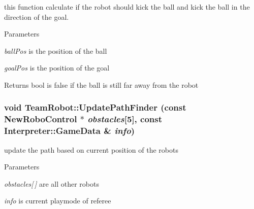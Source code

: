 this function calculate if the robot should kick the ball and kick the ball in the direction of the goal. 


\begin{DoxyParams}{Parameters}
\item[{\em ballPos}]is the position of the ball \item[{\em goalPos}]is the position of the goal \end{DoxyParams}
\begin{DoxyReturn}{Returns}
bool is false if the ball is still far away from the robot 
\end{DoxyReturn}
\hypertarget{classTeamRobot_a1216ffb71821002b6e6845390c990d5f}{
\subsubsection[{UpdatePathFinder}]{\setlength{\rightskip}{0pt plus 5cm}void TeamRobot::UpdatePathFinder (const {\bf NewRoboControl} $\ast$ {\em obstacles}\mbox{[}5\mbox{]}, \/  const {\bf Interpreter::GameData} \& {\em info})}}
\label{classTeamRobot_a1216ffb71821002b6e6845390c990d5f}


update the path based on current position of the robots 


\begin{DoxyParams}{Parameters}
\item[{\em obstacles\mbox{[}$\,$\mbox{]}}]are all other robots \item[{\em info}]is current playmode of referee \end{DoxyParams}



